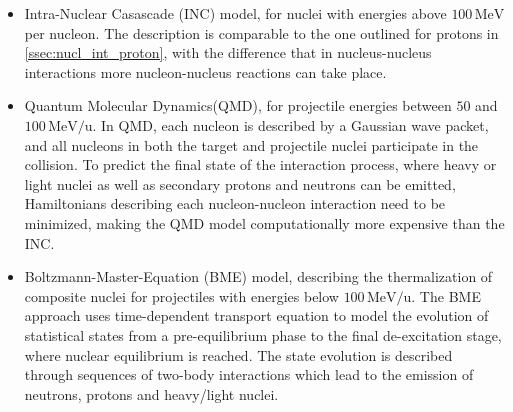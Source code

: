 \begin{itemize}
	\item Intra-Nuclear Casascade (INC) model, for nuclei with energies above $100\,\mathrm{MeV}$ per nucleon. The description is comparable to the one outlined for protons in \autoref{ssec:nucl_int_proton}, with the difference that in nucleus-nucleus interactions more nucleon-nucleus reactions can take place.
	\item Quantum Molecular Dynamics(QMD), for projectile energies between $50$ and $100\,\mathrm{MeV/u}$. In QMD, each nucleon is described by a Gaussian wave packet, and all nucleons in both the target and projectile nuclei participate in the collision. To predict the final state of the interaction process, where heavy or light nuclei as well as secondary protons and neutrons can be emitted, Hamiltonians describing each nucleon-nucleon interaction need to be minimized, making the QMD model computationally more expensive than the INC.
	\item Boltzmann-Master-Equation (BME) model, describing the thermalization of composite nuclei for projectiles with energies below $100\,\mathrm{MeV/u}$. The BME approach uses time-dependent transport equation to model the evolution of statistical states from a pre-equilibrium phase to the final de-excitation stage, where nuclear equilibrium is reached. The state evolution is described through sequences of two-body interactions which lead to the emission of neutrons, protons and heavy/light nuclei.
\end{itemize}
